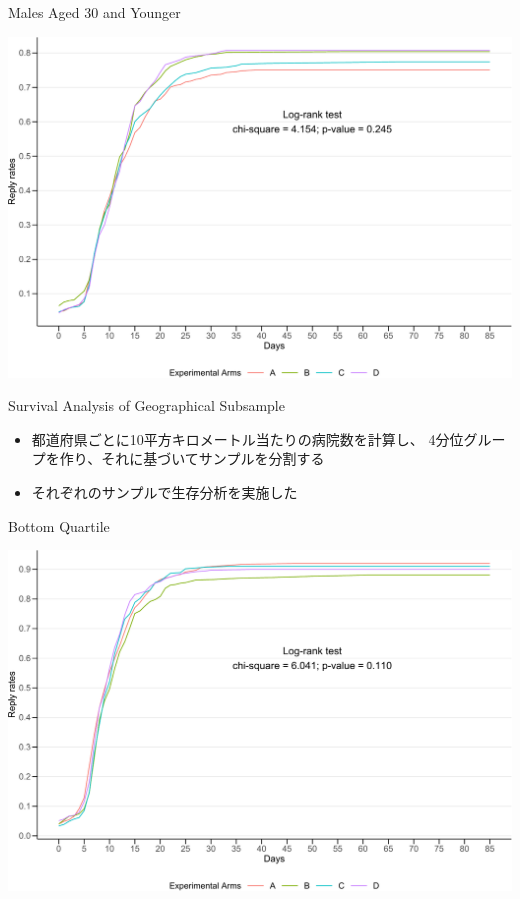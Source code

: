 \documentclass[
      aspectratio=169,
        12pt,
    ]{beamer}
\providecommand{\tightlist}{%
  \setlength{\itemsep}{0pt}\setlength{\parskip}{0pt}}
\begin{document}
\begin{frame}{Males Aged 30 and Younger}
\protect\hypertarget{males-aged-30-and-younger}{}
\begin{center}\includegraphics[width=0.75\linewidth]{report_files/figure-beamer/plot-surv-male-under30-1} \end{center}
\end{frame}

\begin{frame}{Survival Analysis of Geographical Subsample}
\protect\hypertarget{survival-analysis-of-geographical-subsample}{}
\begin{itemize}
\tightlist
\item
  都道府県ごとに10平方キロメートル当たりの病院数を計算し、
  4分位グループを作り、それに基づいてサンプルを分割する
\item
  それぞれのサンプルで生存分析を実施した
\end{itemize}
\end{frame}

\begin{frame}{Bottom Quartile}
\protect\hypertarget{bottom-quartile}{}
\begin{center}\includegraphics[width=0.75\linewidth]{report_files/figure-beamer/plot-surv-bottom-1} \end{center}
\end{frame}
\end{document}
